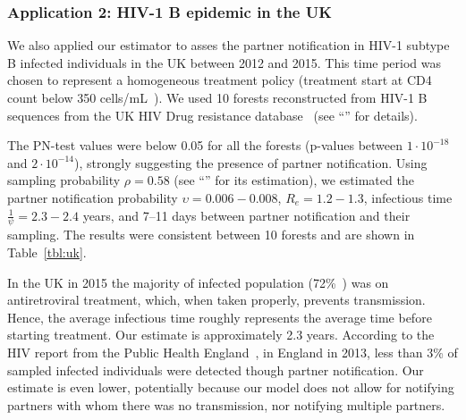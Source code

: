 \documentclass[10pt,letterpaper]{article}
\begin{document}
\subsubsection*{Application 2: HIV-1 B epidemic in the UK}
We also applied our estimator to asses the partner notification in HIV-1 subtype B infected individuals in the UK between 2012 and 2015. This time period was chosen to represent a homogeneous treatment policy  (treatment start at CD4 count below 350 cells/mL~\cite{williamsBritishHIVAssociation2012}). We used 10 forests reconstructed from HIV-1 B sequences from the UK HIV Drug resistance database~\cite{Dunn2007} (see ``'' for details). 

The PN-test values were below 0.05 for all the forests (p-values between $1 \cdot 10^{-18}$ and $2 \cdot 10^{-14}$), strongly suggesting the presence of partner notification. Using sampling probability $\rho=0.58$ (see ``'' for its estimation), we estimated the partner notification probability $\upsilon=0.006-0.008$, %
$R_e = 1.2-1.3$, infectious time $\frac{1}{\psi} = 2.3-2.4$ years, and 7--11 days between partner notification and their sampling. The results were consistent between 10 forests and are shown in Table~\ref{tbl:uk}. %
 
In the UK in 2015 the majority of infected population (72\%~\cite{aHIVUnitedKingdom2016}) was on antiretroviral treatment, which, when taken properly, prevents transmission. Hence, the average infectious time roughly represents the average time before starting treatment. Our estimate is approximately 2.3 years.  According to the HIV report from the Public Health England~\cite{aHIVUnitedKingdom2014}, in England in 2013, less than 3\% of sampled infected individuals were detected though partner notification. Our estimate is even lower, potentially because our model does not allow for notifying partners with whom there was no transmission, nor notifying multiple partners.
\end{document}
